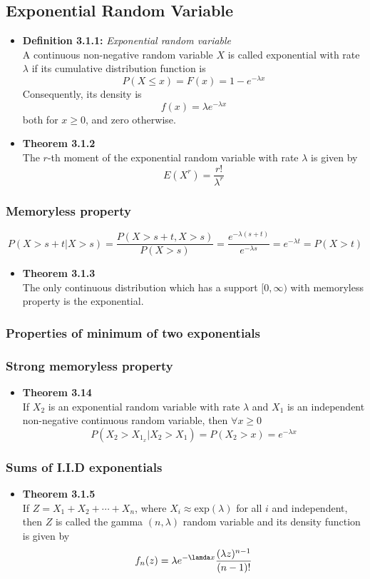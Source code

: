 \documentclass[11pt,a4paper]{article}
\begin{document}
\subsection{Exponential Random Variable}
\begin{itemize}
	\item \textbf{Definition 3.1.1:} \emph{Exponential random variable} \\
        A continuous non-negative random variable $X$ is called exponential with rate $\lambda$ if its cumulative distribution function is
		$$P(X \leq x) = F(x) = 1 - e ^{-\lambda x}$$
		Consequently, its density is
		$$f(x) = \lambda e^{-\lambda x}$$
		both for $x \geq 0$, and zero otherwise.
	\item \textbf{Theorem 3.1.2} \\
		The $r$-th moment of the exponential random variable with rate $\lambda$ is given by
		$$E(X^r) = \frac{r!}{\lambda ^r}$$
\end{itemize}
\subsubsection{Memoryless property}
$$P(X>s+t|X>s) = \frac{P(X>s + t, X>s)}{P(X>s)} = \frac{e^{-\lambda (s+t)}}{e^{-\lambda s}} = e^{-\lambda t} = P(X>t)$$
\begin{itemize}
	\item \textbf{Theorem 3.1.3} \\
		The only continuous distribution which has a support $[0,\infty)$ with memoryless property is the exponential.
\end{itemize}
\subsubsection{Properties of minimum of two exponentials}
\subsubsection{Strong memoryless property}
\begin{itemize}
	\item \textbf{Theorem 3.14} \\
		If $X_2$ is an exponential random variable with rate $\lambda$ and $X_1$ is an independent non-negative continuous random variable, then $\forall x \geq 0$
		$$P(X_2 > X_1 _ x | X_2 > X_1) = P(X_2 > x) = e^{-\lambda x}$$
\end{itemize}
\subsubsection{Sums of I.I.D exponentials}
\begin{itemize}
	\item \textbf{Theorem 3.1.5} \\
		If $Z = X_1 + X_2 + \cdots + X_n$, where $X_i \approx \text{exp}(\lambda)$ for all $i$ and independent, then $Z$ is called the gamma $(n, \lambda)$ random variable and its density function is given by
		$$f_n(z) = \lambda e^{-\lamda x} \frac{(\lambda z)^{n-1}}{(n-1)!}$$
\end{itemize}
\end{document}
